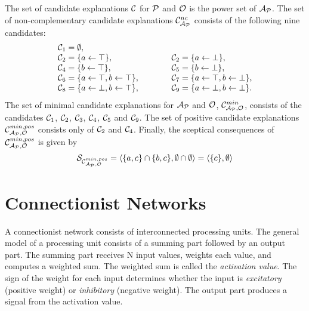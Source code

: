 \begin{tcolorbox}
\begin{example}
\newline
The set of candidate explanations $\mathcal{C}$ for $\mathcal{P}$ and $\mathcal{O}$ is the power set of $\mathcal{A}_{\mathcal{P}}$. The set of non-complementary candidate explanations $\mathcal{C}_{\mathcal{A}_{\mathcal{P}}}^{nc}$ consists of the following nine candidates:
\[
\begin{array}{lcl}
\mathcal{C}_1 = \emptyset, &\quad\quad& \\
\mathcal{C}_2 = \{a \leftarrow \top\}, &\quad\quad& \mathcal{C}_2 = \{a \leftarrow \bot\}, \\
\mathcal{C}_4 = \{b \leftarrow \top\}, &\quad\quad& \mathcal{C}_5 = \{b \leftarrow \bot\}, \\
\mathcal{C}_6 = \{a \leftarrow \top, b \leftarrow \top\}, &\quad\quad& \mathcal{C}_7 = \{a \leftarrow \top, b \leftarrow \bot\}, \\
\mathcal{C}_8 = \{a \leftarrow \bot, b \leftarrow \top\}, &\quad\quad&\mathcal{C}_9 = \{a \leftarrow \bot, b \leftarrow \bot\}. \\
\end{array}
\]
The set of minimal candidate explanations for $\mathcal{A}_{\mathcal{P}}$ and $\mathcal{O}$, $\mathcal{C}_{\mathcal{A}_{\mathcal{P}},\mathcal{O}}^{min}$, consists of the candidates $\mathcal{C}_1$, $\mathcal{C}_2$, $\mathcal{C}_3$, $\mathcal{C}_4$, $\mathcal{C}_5$ and $\mathcal{C}_9$. The set of positive candidate explanations $\mathcal{C}_{\mathcal{A}_{\mathcal{P}},\mathcal{O}}^{min, pos}$ consists only of $\mathcal{C}_2$ and $\mathcal{C}_4$. Finally, the sceptical consequences of $\mathcal{C}_{\mathcal{A}_{\mathcal{P}},\mathcal{O}}^{min, pos}$ is given by
\[
\mathcal{S}_{\mathcal{C}_{\mathcal{A}_{\mathcal{P}},\mathcal{O}}^{min, pos}} = \langle \{a, c\} \cap \{b, c\}, \emptyset \cap \emptyset \rangle = \langle \{c\}, \emptyset \rangle
\]
\end{example}
\end{tcolorbox}
\vspace*{\fill}
\newpage

\section{Connectionist Networks}
\label{sec:preliminaries:cn}

A connectionist network consists of interconnected processing units. The general model of a processing unit consists of a summing part followed by an output part. The summing part receives N input values, weights each value, and computes a weighted sum. The weighted sum is called the \textit{activation value}. The sign of the weight for each input determines whether the input is \textit{excitatory} (positive weight) or \textit{inhibitory} (negative weight). The output part produces a signal from the activation value. 

